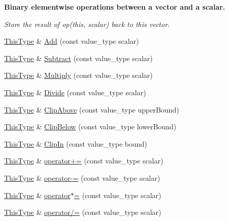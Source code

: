 \begin{Indent}{\bf Binary elementwise operations between a vector and a scalar.}\par
{\em Store the result of op(this, scalar) back to this vector. }\begin{DoxyCompactItemize}
\item 
\hyperlink{classvct_dynamic_const_vector_base_a39da273523717f678f54d3321ebca3dd}{This\+Type} \& \hyperlink{classvct_dynamic_vector_base_ac5fd1fdbda2f81924cbbf4de056e5435}{Add} (const value\+\_\+type scalar)
\item 
\hyperlink{classvct_dynamic_const_vector_base_a39da273523717f678f54d3321ebca3dd}{This\+Type} \& \hyperlink{classvct_dynamic_vector_base_a2d860076420a521f60caad0470f21bdb}{Subtract} (const value\+\_\+type scalar)
\item 
\hyperlink{classvct_dynamic_const_vector_base_a39da273523717f678f54d3321ebca3dd}{This\+Type} \& \hyperlink{classvct_dynamic_vector_base_aafb96cc6707729560680238849f6cf02}{Multiply} (const value\+\_\+type scalar)
\item 
\hyperlink{classvct_dynamic_const_vector_base_a39da273523717f678f54d3321ebca3dd}{This\+Type} \& \hyperlink{classvct_dynamic_vector_base_a4716f1b6eb5b3373f023c77c775abace}{Divide} (const value\+\_\+type scalar)
\item 
\hyperlink{classvct_dynamic_const_vector_base_a39da273523717f678f54d3321ebca3dd}{This\+Type} \& \hyperlink{classvct_dynamic_vector_base_acb2e769ff0f70bbce2e45d549f8a23c0}{Clip\+Above} (const value\+\_\+type upper\+Bound)
\item 
\hyperlink{classvct_dynamic_const_vector_base_a39da273523717f678f54d3321ebca3dd}{This\+Type} \& \hyperlink{classvct_dynamic_vector_base_af73430126994c263c1169837a9c9c58d}{Clip\+Below} (const value\+\_\+type lower\+Bound)
\item 
\hyperlink{classvct_dynamic_const_vector_base_a39da273523717f678f54d3321ebca3dd}{This\+Type} \& \hyperlink{classvct_dynamic_vector_base_a5e3a219ac2bf358961fb67ec48639d6c}{Clip\+In} (const value\+\_\+type bound)
\item 
\hyperlink{classvct_dynamic_const_vector_base_a39da273523717f678f54d3321ebca3dd}{This\+Type} \& \hyperlink{classvct_dynamic_vector_base_a6a60f395f89f628e44566c6d574e9579}{operator+=} (const value\+\_\+type scalar)
\item 
\hyperlink{classvct_dynamic_const_vector_base_a39da273523717f678f54d3321ebca3dd}{This\+Type} \& \hyperlink{classvct_dynamic_vector_base_a00d36e2c3d0443099567cbe840af0821}{operator-\/=} (const value\+\_\+type scalar)
\item 
\hyperlink{classvct_dynamic_const_vector_base_a39da273523717f678f54d3321ebca3dd}{This\+Type} \& \hyperlink{classvct_dynamic_vector_base_a955c825c03c72580f33a605e8075ffb2}{operator$\ast$=} (const value\+\_\+type scalar)
\item 
\hyperlink{classvct_dynamic_const_vector_base_a39da273523717f678f54d3321ebca3dd}{This\+Type} \& \hyperlink{classvct_dynamic_vector_base_a273990280eeaaaab279fb696650d1e7f}{operator/=} (const value\+\_\+type scalar)
\end{DoxyCompactItemize}
\end{Indent}

